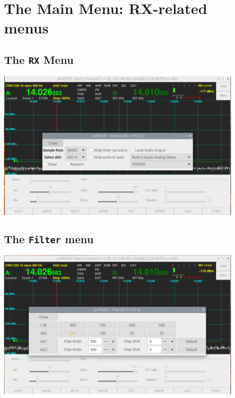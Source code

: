 \documentclass[12pt]{book}
\begin{document}
\chapter{The Main Menu: RX-related menus}

\section{The \texttt{RX} Menu}
\begin{center}
\includegraphics[width=12cm]{RXMenu.png}
\end{center}

\section{The \texttt{Filter} menu}
\begin{center}
\includegraphics[width=12cm]{FilterMenu.png}
\end{center}
\end{document}
